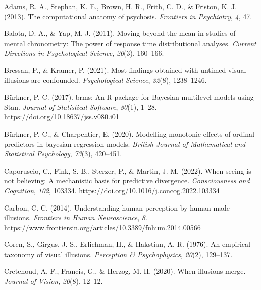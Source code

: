 \documentclass[
  man,floatsintext]{apa6}
\newlength{\cslhangindent}
\newlength{\cslentryspacingunit} %
\newenvironment{CSLReferences}[2] %
 {%
  \setlength{\parindent}{0pt}
  \ifodd #1
  \let\oldpar\par
  \def\par{\hangindent=\cslhangindent\oldpar}
  \fi
  \setlength{\parskip}{#2\cslentryspacingunit}
 }%
 {}
\begin{document}
\hypertarget{refs}{}
\begin{CSLReferences}{1}{0}
\leavevmode{}%
Adams, R. A., Stephan, K. E., Brown, H. R., Frith, C. D., \& Friston, K. J. (2013). The computational anatomy of psychosis. \emph{Frontiers in Psychiatry}, \emph{4}, 47.

\leavevmode{}%
Balota, D. A., \& Yap, M. J. (2011). Moving beyond the mean in studies of mental chronometry: The power of response time distributional analyses. \emph{Current Directions in Psychological Science}, \emph{20}(3), 160--166.

\leavevmode{}%
Bressan, P., \& Kramer, P. (2021). Most findings obtained with untimed visual illusions are confounded. \emph{Psychological Science}, \emph{32}(8), 1238--1246.

\leavevmode{}%
Bürkner, P.-C. (2017). {brms}: An {R} package for {Bayesian} multilevel models using {Stan}. \emph{Journal of Statistical Software}, \emph{80}(1), 1--28. \url{https://doi.org/10.18637/jss.v080.i01}

\leavevmode{}%
Bürkner, P.-C., \& Charpentier, E. (2020). Modelling monotonic effects of ordinal predictors in bayesian regression models. \emph{British Journal of Mathematical and Statistical Psychology}, \emph{73}(3), 420--451.

\leavevmode{}%
Caporuscio, C., Fink, S. B., Sterzer, P., \& Martin, J. M. (2022). When seeing is not believing: A mechanistic basis for predictive divergence. \emph{Consciousness and Cognition}, \emph{102}, 103334. \url{https://doi.org/10.1016/j.concog.2022.103334}

\leavevmode{}%
Carbon, C.-C. (2014). Understanding human perception by human-made illusions. \emph{Frontiers in Human Neuroscience}, \emph{8}. \url{https://www.frontiersin.org/articles/10.3389/fnhum.2014.00566}

\leavevmode{}%
Coren, S., Girgus, J. S., Erlichman, H., \& Hakstian, A. R. (1976). An empirical taxonomy of visual illusions. \emph{Perception \& Psychophysics}, \emph{20}(2), 129--137.

\leavevmode{}%
Cretenoud, A. F., Francis, G., \& Herzog, M. H. (2020). When illusions merge. \emph{Journal of Vision}, \emph{20}(8), 12--12.


\end{CSLReferences}
\end{document}
